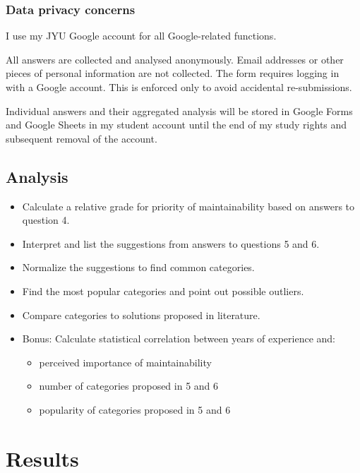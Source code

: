 \documentclass[utf8,english]{gradu3}
\begin{document}
\subsection{Data privacy concerns}
I use my JYU Google account for all Google-related functions.

All answers are collected and analysed anonymously.
Email addresses or other pieces of personal information are not collected.
The form requires logging in with a Google account.
This is enforced only to avoid accidental re-submissions.

Individual answers and their aggregated analysis will be stored in Google Forms and
Google Sheets in my student account until the end of my study rights and
subsequent removal of the account.


\section{Analysis}

\begin{itemize}
  \item Calculate a relative grade for priority of maintainability based on answers to question 4.
  \item Interpret and list the suggestions from answers to questions 5 and 6.
  \item Normalize the suggestions to find common categories.
  \item Find the most popular categories and point out possible outliers.
  \item Compare categories to solutions proposed in literature.
  \item Bonus: Calculate statistical correlation between years of experience and:
        \begin{itemize}
          \item perceived importance of maintainability
          \item number of categories proposed in 5 and 6
          \item popularity of categories proposed in 5 and 6
        \end{itemize}
\end{itemize}


\chapter{Results}
\end{document}
